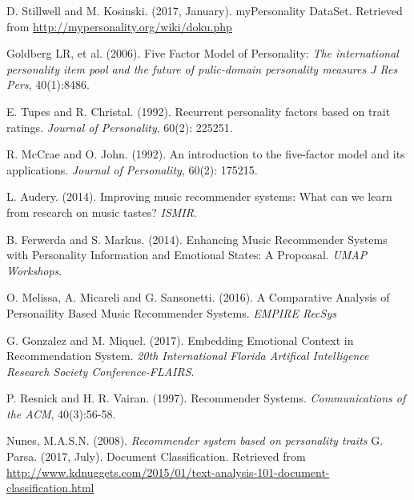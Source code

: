 \documentclass[journal]{IEEEtran}
\begin{document}

%
%
%
\begin{thebibliography}{1}
D. Stillwell and M. Kosinski. (2017, January). myPersonality DataSet. Retrieved from \url{ http://mypersonality.org/wiki/doku.php}

Goldberg LR, et al. (2006). Five Factor Model of Personality:  \textit{The international personality item pool and the future of pulic-domain personality measures J Res Pers}, 40(1):8486.

E. Tupes and R. Christal. (1992). Recurrent personality factors based on trait ratings. \textit{Journal of Personality}, 60(2): 225251.

R. McCrae and O. John. (1992). An introduction to the five-factor model and its applications. \textit{Journal of Personality}, 60(2): 175215.

L. Audery. (2014). Improving music recommender systems: What can we learn from research on music tastes? \textit{ISMIR}.

B. Ferwerda and S. Markus. (2014). Enhancing Music Recommender Systems with Personality Information and Emotional States: A Propoasal. \textit{UMAP Workshops}.

O. Melissa, A. Micareli and G. Sansonetti. (2016). A Comparative Analysis of Personaility Based Music Recommender Systems. \textit{EMPIRE RecSys}

G. Gonzalez and M. Miquel. (2017). Embedding Emotional Context in Recommendation System. \textit{20th International Florida Artifical Intelligence Research Society Conference-FLAIRS}.

P. Resnick and H. R. Vairan. (1997). Recommender Systems. \textit{Communications of the ACM}, 40(3):56-58.

Nunes, M.A.S.N. (2008). \textit{Recommender system based on personality traits}
G. Parsa. (2017, July). Document Classification. Retrieved from \url{http://www.kdnuggets.com/2015/01/text-analysis-101-document-classification.html}


\end{thebibliography}
\end{document}
